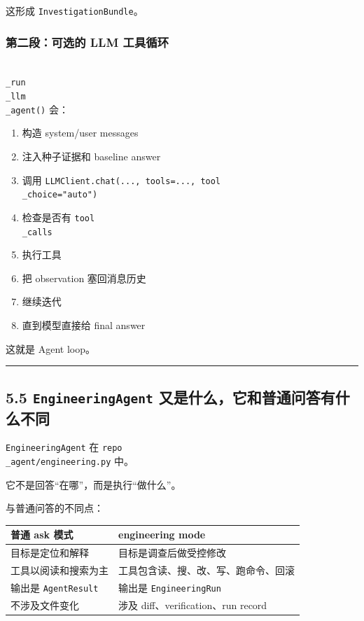 \documentclass[UTF8,12pt,openany]{ctexbook}
\begin{document}
这形成 \texttt{InvestigationBundle}。\par

\subsubsection{第二段：可选的 LLM 工具循环}

\texttt{\\_run\\_llm\\_agent()} 会：\par

\begin{enumerate}
\item 构造 system/user messages
\item 注入种子证据和 baseline answer
\item 调用 \texttt{LLMClient.chat(..., tools=..., tool\\_choice="auto")}
\item 检查是否有 \texttt{tool\\_calls}
\item 执行工具
\item 把 observation 塞回消息历史
\item 继续迭代
\item 直到模型直接给 final answer
\end{enumerate}

这就是 Agent loop。\par

\hrule

\subsection{5.5 \texttt{EngineeringAgent} 又是什么，它和普通问答有什么不同}

\texttt{EngineeringAgent} 在 \texttt{repo\\_agent/engineering.py} 中。\par

它不是回答“在哪”，而是执行“做什么”。\par

与普通问答的不同点：\par

\begin{center}
\small
\begin{longtable}{|p{}|p{}|}
\toprule
普通 ask 模式 & engineering mode \\
\midrule
目标是定位和解释 & 目标是调查后做受控修改 \\
工具以阅读和搜索为主 & 工具包含读、搜、改、写、跑命令、回滚 \\
输出是 \texttt{AgentResult} & 输出是 \texttt{EngineeringRun} \\
不涉及文件变化 & 涉及 diff、verification、run record \\
\bottomrule
\end{longtable}
\end{center}
\end{document}
